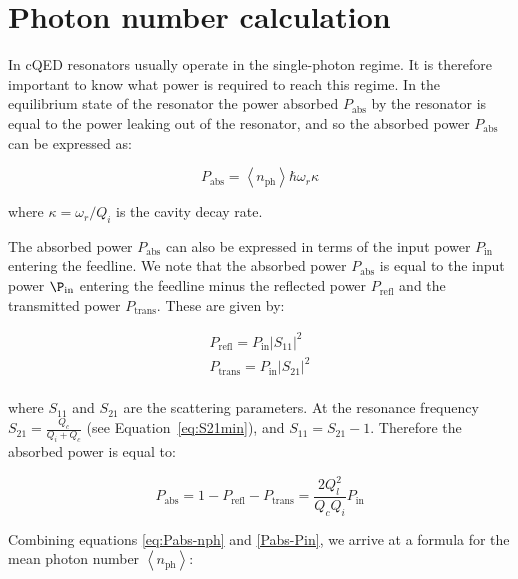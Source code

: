 




\chapter{Photon number calculation}
  \label{ch:photon number calculation}

  In cQED resonators usually operate in the single-photon regime. It is therefore important to know what power is required to reach this regime. In the equilibrium state of the resonator the power absorbed $P_\text{abs}$ by the resonator is equal to the power leaking out of the resonator, and so the absorbed power $P_\text{abs}$ can be expressed as:

  \begin{equation}
    P_\text{abs} = \left<n_\text{ph}\right>\hbar\omega_r \kappa
    \label{eq:Pabs-nph}
  \end{equation}

  where $\kappa=\omega_r/Q_i$ is the cavity decay rate.

  The absorbed power $P_\text{abs}$ can also be expressed in terms of the input power $P_\text{in}$ entering the feedline. We note that the absorbed power $P_\text{abs}$ is equal to the input power $\P_\text{in}$ entering the feedline minus the reflected power $P_\text{refl}$ and the transmitted power $P_\text{trans}$. These are given by:

  \begin{align}
    P_\text{refl} = P_\text{in}\left|S_{11}\right|^2\\
    P_\text{trans} = P_\text{in}\left|S_{21}\right|^2\\
  \end{align}

  where $S_{11}$ and $S_{21}$ are the scattering parameters. At the resonance frequency $S_{21}=\frac{Q_c}{Q_i+Q_c}$ (see Equation~\ref{eq:S21min}), and $S_{11}=S_{21}-1$. Therefore the absorbed power is equal to:

  \begin{equation}
    P_\text{abs}=1-P_\text{refl}-P_\text{trans}=\frac{2Q_l^2}{Q_c Q_i}P_\text{in}
    \label{Pabs-Pin}
  \end{equation}

  Combining equations \ref{eq:Pabs-nph} and \ref{Pabs-Pin}, we arrive at a formula for the mean photon number $\left<n_\text{ph}\right>$:


